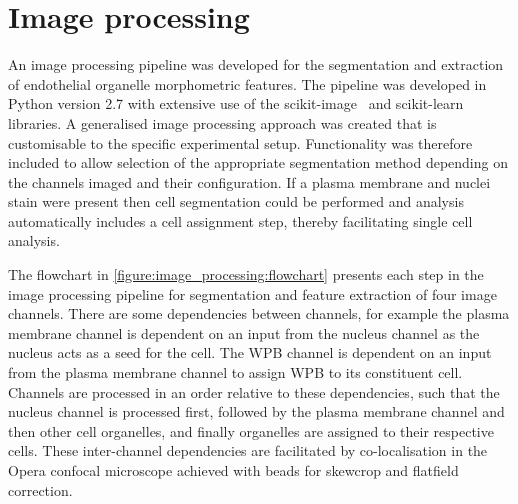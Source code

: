 \section{Image processing}
\label{endothelial_morphometry:image_processing}
An image processing pipeline was developed for the segmentation and extraction of endothelial organelle morphometric features. The pipeline was developed in Python version 2.7 with extensive use of the scikit-image~\cite{VanderWalt2014} and scikit-learn~\cite{Pedregosa2011} libraries. A generalised image processing approach was created that is customisable to the specific experimental setup. Functionality was therefore included to allow selection of the appropriate segmentation method depending on the channels imaged and their configuration. If a plasma membrane and nuclei stain were present then cell segmentation could be performed and analysis automatically includes a cell assignment step, thereby facilitating single cell analysis.

The flowchart in \autoref{figure:image_processing:flowchart} presents each step in the image processing pipeline for segmentation and feature extraction of four image channels. There are some dependencies between channels, for example the plasma membrane channel is dependent on an input from the nucleus channel as the nucleus acts as a seed for the cell. The WPB channel is dependent on an input from the plasma membrane channel to assign WPB to its constituent cell. Channels are processed in an order relative to these dependencies, such that the nucleus channel is processed first, followed by the plasma membrane channel and then other cell organelles, and finally organelles are assigned to their respective cells. These inter-channel dependencies are facilitated by co-localisation in the Opera confocal microscope achieved with beads for skewcrop and flatfield correction.


